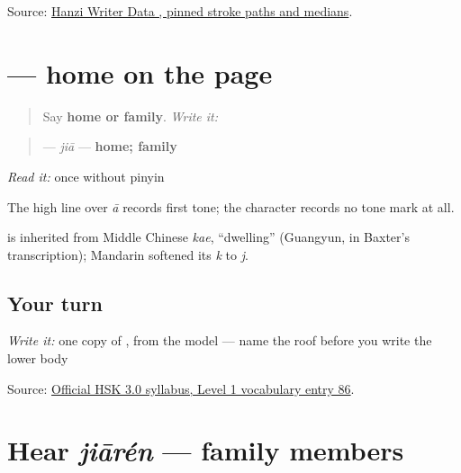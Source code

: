 \begin{tcolorbox}[breakable,colback=teal!4,colframe=teal!35!black,title={Before you move on}]
Source: \href{https://raw.githubusercontent.com/chanind/hanzi-writer-data/68d10a4b21150cae5e1ebbd223eed289cf32d90c/data/\%E5\%AE\%B6.json}{Hanzi Writer Data , pinned stroke paths and medians}.
\end{tcolorbox}
\section[\texorpdfstring{\zh{家} (jiā)}{家 (jiā)}]{ — home on the page}

\label{lesson:ZH-C12-jia}



\begin{quote}
Say \textbf{home or family}. \emph{Write it:} 
\end{quote}

\begin{cousinweb}
\begin{quote}
\textbf{} — \emph{jiā} — \textbf{home; family}
\end{quote}

\emph{Read it:} \textbf{} once without pinyin

The high line over \emph{ā} records first tone; the character records no tone mark at all.

\textbf{} is inherited from Middle Chinese \emph{kae}, \textquotedblleft{}dwelling\textquotedblright{} (Guangyun, in Baxter's transcription); Mandarin softened its \emph{k} to \emph{j}.
\end{cousinweb}

\subsection*{Your turn}
\emph{Write it:} one copy of \textbf{}, from the model — name the roof before you write the lower body

\begin{tcolorbox}[breakable,colback=teal!4,colframe=teal!35!black,title={Before you move on}]
Source: \href{https://hsk.cn-bj.ufileos.com/3.0/\%E6\%96\%B0\%E7\%89\%88HSK\%E8\%80\%83\%E8\%AF\%95\%E5\%A4\%A7\%E7\%BA\%B21219.pdf}{Official HSK 3.0 syllabus, Level 1 vocabulary entry 86}.
\end{tcolorbox}
\section[jiārén]{Hear \emph{jiārén} — family members}

